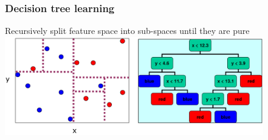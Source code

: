 \documentclass{beamer}
\begin{document}
\begin{frame}
    \frametitle{Decision tree learning}
    Recursively split feature space into sub-spaces until they are pure\\
    \vspace*{5mm}
    \centering\includegraphics[height=4.3cm,keepaspectratio]{pics/DT_final.png}%
     
\end{frame}



 

\end{document}
